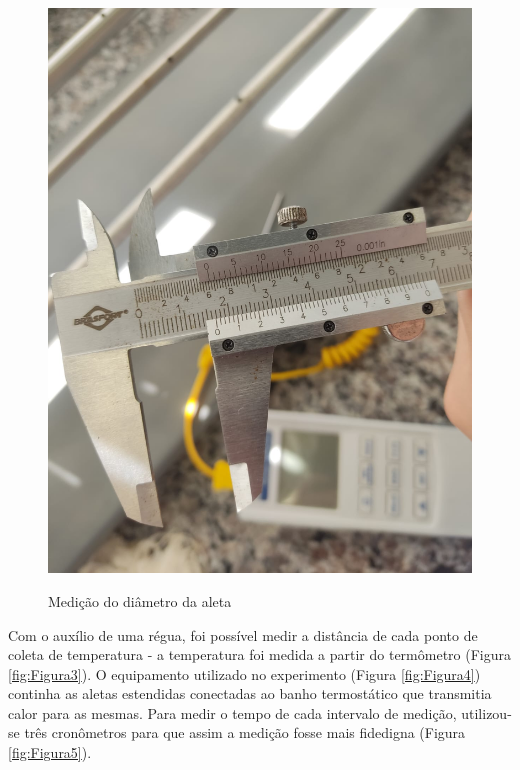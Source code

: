 \documentclass[12pt,openright,twoside,a4paper]{abntex2}
\begin{document}
\begin{figure}[H]
	\caption{Medição do diâmetro da aleta}
	\centering
	\includegraphics[scale=0.15]{figura2.jpg}
	\label{fig:Figura2}
\end{figure}

Com o auxílio de uma régua, foi possível medir a distância de cada ponto de coleta de temperatura - a temperatura foi medida a partir do termômetro (Figura \ref{fig:Figura3}). O equipamento utilizado no experimento (Figura \ref{fig:Figura4}) continha as aletas estendidas conectadas ao banho termostático que transmitia calor para as mesmas. Para medir o tempo de cada intervalo de medição, utilizou-se três cronômetros para que assim a medição fosse mais fidedigna (Figura \ref{fig:Figura5}).
\end{document}
